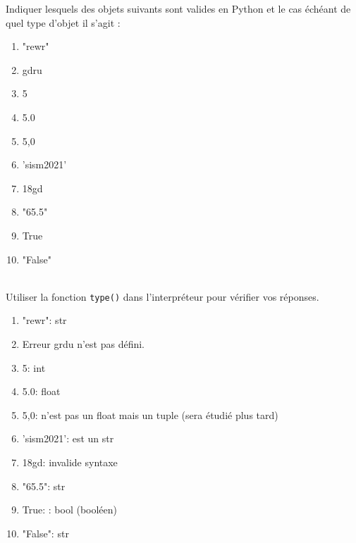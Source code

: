 \documentclass[a4paper,12pt]{article}
\begin{document}
Indiquer lesquels des objets suivants sont valides en Python et le cas échéant de quel type d'objet il s'agit :
\begin{multicols}{2}
	\begin{enumerate}[label=\alph*)]
		\item "rewr"
		\item gdru
		\item 5
		\item 5.0
		\item 5,0
		\item 'sism2021'
		\item 18gd
		\item "65.5"
		\item True
		\item "False"
	\end{enumerate}
\end{multicols}
	\begin{correction}
	~\\ 
	Utiliser la fonction \lstinline{type()} dans l'interpréteur \py pour vérifier vos réponses.
	\begin{multicols}{2}
	\begin{enumerate}[label=\alph*)]
		\item "rewr": str
		\item Erreur grdu n'est pas défini.
		\item 5: int
		\item 5.0: float
		\item 5,0: n'est pas un float mais un tuple (sera étudié plus tard)
		\item 'sism2021': est un str
		\item 18gd: invalide syntaxe
		\item "65.5": str
		\item True: : bool (booléen)
		\item "False": str
	\end{enumerate}
\end{multicols}
\end{correction}
\finexo
\end{document}
